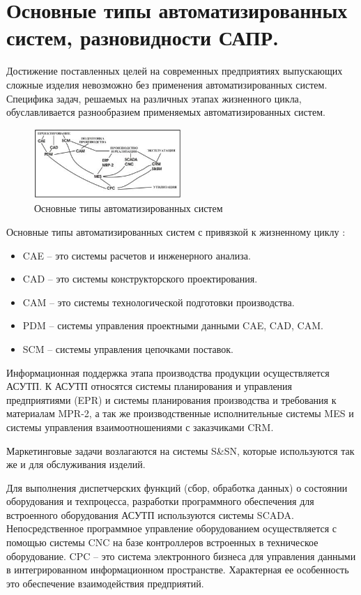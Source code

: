 \documentclass[unicode, 12pt, a4paper, oneside]{article}
\begin{document}
\section{Основные типы автоматизированных систем, разновидности САПР.}

Достижение поставленных целей на современных предприятиях выпускающих сложные изделия невозможно без применения автоматизированных систем. Специфика задач, решаемых на различных этапах жизненного цикла, обуславливается разнообразием применяемых автоматизированных систем.

\begin{figure}[H]
\centering
\includegraphics[width=0.5\textwidth]{124.jpg}
\caption{Основные типы автоматизированных систем}
\end{figure}

Основные типы автоматизированных систем с привязкой к жизненному циклу :

\begin{itemize}
\item CAE – это системы расчетов и инженерного анализа.
\item CAD – это системы конструкторского проектирования.
\item CAM – это системы технологической подготовки производства.
\item PDM – системы управления проектными данными CAE, CAD, CAM.
\item SCM – системы управления цепочками поставок.
\end{itemize}

Информационная поддержка этапа производства продукции осуществляется АСУТП. К АСУТП относятся системы планирования и управления предприятиями (EPR) и системы планирования производства и требования к материалам MPR-2, а так же производственные исполнительные системы MES  и системы управления взаимоотношениями с заказчиками CRM.

Маркетинговые задачи возлагаются на системы S\&SN, которые используются так же и для обслуживания изделий.

Для выполнения диспетчерских функций (сбор, обработка данных) о состоянии оборудования и техпроцесса, разработки программного обеспечения для встроенного оборудования АСУТП используются системы SCADA. Непосредственное программное управление оборудованием осуществляется с помощью системы CNC на базе контроллеров встроенных в техническое оборудование. CPC – это система электронного бизнеса для управления данными в интегрированном информационном пространстве. Характерная ее особенность это обеспечение взаимодействия предприятий.
\end{document}
